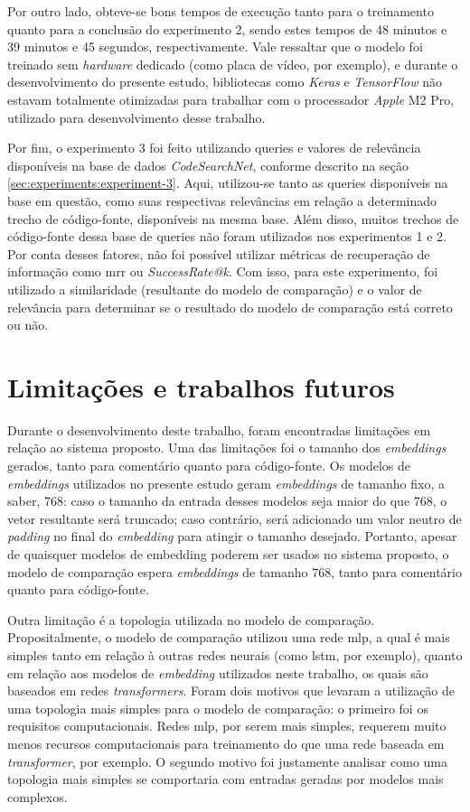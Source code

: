 Por outro lado, obteve-se bons tempos de execução tanto para o treinamento quanto para a conclusão do experimento 2, sendo estes tempos de 48 minutos e 39 minutos e 45 segundos, respectivamente. Vale ressaltar que o modelo foi treinado sem \textit{hardware} dedicado (como placa de vídeo, por exemplo), e durante o desenvolvimento do presente estudo, bibliotecas como \textit{Keras} e \textit{TensorFlow} não estavam totalmente otimizadas para trabalhar com o processador \textit{Apple} M2 Pro, utilizado para desenvolvimento desse trabalho.

Por fim, o experimento 3 foi feito utilizando queries e valores de relevância disponíveis na base de dados \textit{CodeSearchNet}, conforme descrito na seção \ref{sec:experiments:experiment-3}. Aqui, utilizou-se tanto as queries disponíveis na base em questão, como suas respectivas relevâncias em relação a determinado trecho de código-fonte, disponíveis na mesma base. Além disso, muitos trechos de código-fonte dessa base de queries não foram utilizados nos experimentos 1 e 2. Por conta desses fatores, não foi possível utilizar métricas de recuperação de informação como \gls{mrr} ou \textit{SuccessRate@k}. Com isso, para este experimento, foi utilizado a similaridade (resultante do modelo de comparação) e o valor de relevância para determinar se o resultado do modelo de comparação está correto ou não.

\section{Limitações e trabalhos futuros}
\label{sec:discussions:future-works}

Durante o desenvolvimento deste trabalho, foram encontradas limitações em relação ao sistema proposto. Uma das limitações foi o tamanho dos \textit{embeddings} gerados, tanto para comentário quanto para código-fonte. Os modelos de \textit{embeddings} utilizados no presente estudo geram \textit{embeddings} de tamanho fixo, a saber, 768: caso o tamanho da entrada desses modelos seja maior do que 768, o vetor resultante será truncado; caso contrário, será adicionado um valor neutro de \textit{padding} no final do \textit{embedding} para atingir o tamanho desejado. Portanto, apesar de quaisquer modelos de embedding poderem ser usados no sistema proposto, o modelo de comparação espera \textit{embeddings} de tamanho 768, tanto para comentário quanto para código-fonte.

Outra limitação é a topologia utilizada no modelo de comparação. Propositalmente, o modelo de comparação utilizou uma rede \gls{mlp}, a qual é mais simples tanto em relação à outras redes neurais (como \gls{lstm}, por exemplo), quanto em relação aos modelos de \textit{embedding} utilizados neste trabalho, os quais são baseados em redes \textit{transformers}. Foram dois motivos que levaram a utilização de uma topologia mais simples para o modelo de comparação: o primeiro foi os requisitos computacionais. Redes \gls{mlp}, por serem mais simples, requerem muito menos recursos computacionais para treinamento do que uma rede baseada em \textit{transformer}, por exemplo. O segundo motivo foi justamente analisar como uma topologia mais simples se comportaria com entradas geradas por modelos mais complexos.

